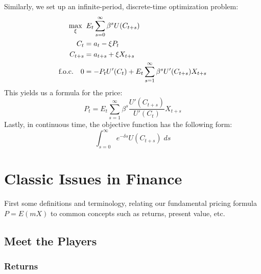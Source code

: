 \documentclass[a4paper,12pt]{scrartcl}
\begin{document}
Similarly, we set up an infinite-period, discrete-time
optimization problem:
\begin{align}
    \max_{\xi} \; & \;
	E_t \sum^\infty_{s=0} \beta^s U(C_{t+s})  \\
    C_t &= a_t - \xi P_t \notag \\
    C_{t+s} &= a_{t+s} + \xi X_{t+s} \notag \\
    \text{f.o.c.} \quad 0 &= -P_t U'(C_t) +
	E_t \sum^\infty_{s=1} \beta^s U'(C_{t+s}) X_{t+s}
\end{align}
This yields us a formula for the price:
\begin{equation}
    P_t =
    E_t \sum^\infty_{s=1} \beta^s \frac{U'(C_{t+s})}{U'(C_t)}
    X_{t+s}
\end{equation}
Lastly, in continuous time, the objective function has
the following form:
\begin{equation}
    \int^\infty_{s=0} e^{-\delta s}  U(C_{t+s})\; ds
\end{equation}


\newpage
\section{Classic Issues in Finance}

First some definitions and terminology, relating our fundamental
pricing formula $P = E(mX)$ to common concepts such as
returns, present value, etc.

\subsection{Meet the Players}

\subsubsection{Returns}
\end{document}
